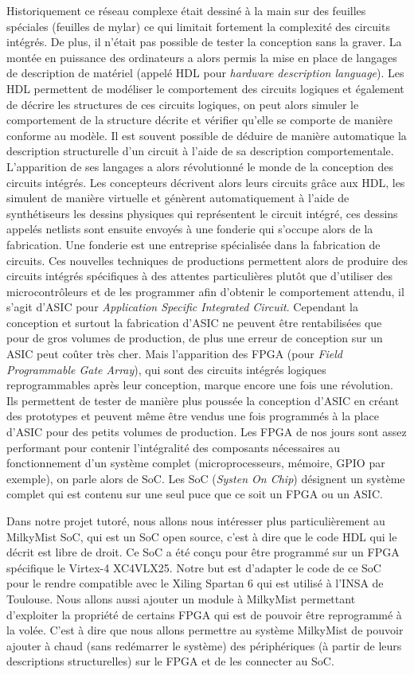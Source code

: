 Historiquement ce réseau complexe était dessiné à la main sur des feuilles spéciales
(feuilles de mylar) ce qui limitait fortement la complexité des circuits intégrés. De
plus, il n'était pas possible de tester la conception sans la graver. La montée en
puissance des ordinateurs a alors permis la mise en place de langages de description
de matériel (appelé HDL pour \textit{hardware description language}). Les HDL
permettent de modéliser le comportement des circuits logiques et également de décrire
les structures de ces circuits logiques, on peut alors simuler le comportement de la
structure décrite et vérifier qu'elle se comporte de manière conforme au modèle. Il
est souvent possible de déduire de manière automatique la description structurelle
d'un circuit à l'aide de sa description comportementale. L'apparition de ses langages
a alors révolutionné le monde de la conception des circuits intégrés. Les concepteurs
décrivent alors leurs circuits grâce aux HDL, les simulent de manière virtuelle et
génèrent automatiquement à l'aide de synthétiseurs les dessins physiques qui
représentent le circuit intégré, ces dessins appelés netlists sont ensuite envoyés à
une fonderie qui s'occupe alors de la fabrication. Une fonderie est une entreprise
spécialisée dans la fabrication de circuits. Ces nouvelles techniques de productions
permettent alors de produire des circuits intégrés spécifiques à des attentes
particulières plutôt que d'utiliser des microcontrôleurs et de les programmer afin
d'obtenir le comportement attendu, il s'agit d'ASIC pour \textit{Application Specific
Integrated Circuit}. Cependant la conception et surtout la fabrication d'ASIC ne
peuvent être rentabilisées que pour de gros volumes de production, de plus une erreur
de conception sur un ASIC peut coûter très cher. Mais l'apparition des FPGA (pour
\textit{Field Programmable Gate Array}), qui sont des circuits intégrés logiques
reprogrammables après leur conception, marque encore une fois une révolution.  Ils
permettent de tester de manière plus poussée la conception d'ASIC en créant des
prototypes et peuvent même être vendus une fois programmés à la place d'ASIC pour des
petits volumes de production. Les FPGA de nos jours sont assez performant pour
contenir l'intégralité des composants nécessaires au fonctionnement d'un système
complet (microprocesseurs, mémoire, GPIO par exemple), on parle alors de SoC. Les SoC
(\textit{Systen On Chip}) désignent un système complet qui est contenu sur une seul
puce que ce soit un FPGA ou un ASIC.

Dans notre projet tutoré, nous allons nous intéresser plus particulièrement au
MilkyMist SoC, qui est un SoC open source, c'est à dire que le code HDL qui le décrit
est libre de droit.  Ce SoC a été conçu pour être programmé sur un FPGA spécifique le
Virtex-4 XC4VLX25.  Notre but est d'adapter le code de ce SoC pour le rendre
compatible avec le Xiling Spartan 6 qui est utilisé à l'INSA de Toulouse.  Nous
allons aussi ajouter un module à MilkyMist permettant d'exploiter la propriété de
certains FPGA qui est de pouvoir être reprogrammé à la volée. C'est à dire que nous
allons permettre au système MilkyMist de pouvoir ajouter à chaud (sans redémarrer le
système) des périphériques (à partir de leurs descriptions structurelles) sur le FPGA
et de les connecter au SoC. 

